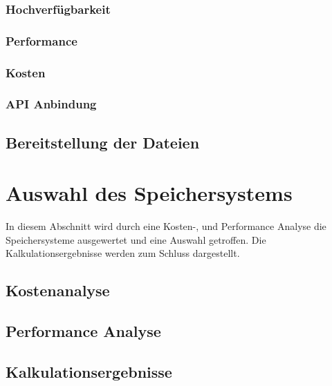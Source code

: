 \subsubsection{Hochverfügbarkeit}
\subsubsection{Performance}
\subsubsection{Kosten}
\subsubsection{API Anbindung}

\subsection{Bereitstellung der Dateien}

\section{Auswahl des Speichersystems}

In diesem Abschnitt wird durch eine Kosten-, und Performance Analyse die Speichersysteme ausgewertet und eine Auswahl getroffen. Die Kalkulationsergebnisse werden zum Schluss dargestellt.

\subsection{Kostenanalyse}
\subsection{Performance Analyse}
\subsection{Kalkulationsergebnisse}